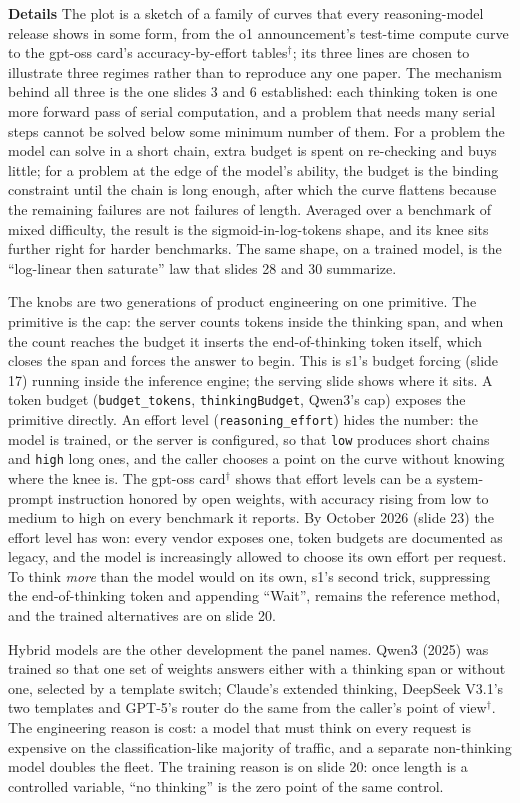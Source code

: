 \documentclass[11pt,letterpaper]{article}
\newcommand{\para}[1]{\medskip\noindent\textbf{#1}\quad}
\begin{document}
\para{Details} The plot is a sketch of a family of curves that every reasoning-model release shows in some form, from the o1 announcement's test-time compute curve to the gpt-oss card's accuracy-by-effort tables$^\dagger$; its three lines are chosen to illustrate three regimes rather than to reproduce any one paper. The mechanism behind all three is the one slides 3 and 6 established: each thinking token is one more forward pass of serial computation, and a problem that needs many serial steps cannot be solved below some minimum number of them. For a problem the model can solve in a short chain, extra budget is spent on re-checking and buys little; for a problem at the edge of the model's ability, the budget is the binding constraint until the chain is long enough, after which the curve flattens because the remaining failures are not failures of length. Averaged over a benchmark of mixed difficulty, the result is the sigmoid-in-log-tokens shape, and its knee sits further right for harder benchmarks. The same shape, on a trained model, is the ``log-linear then saturate'' law that slides 28 and 30 summarize.

The knobs are two generations of product engineering on one primitive. The primitive is the cap: the server counts tokens inside the thinking span, and when the count reaches the budget it inserts the end-of-thinking token itself, which closes the span and forces the answer to begin. This is s1's budget forcing (slide 17) running inside the inference engine; the serving slide shows where it sits. A token budget (\texttt{budget\_tokens}, \texttt{thinkingBudget}, Qwen3's cap) exposes the primitive directly. An effort level (\texttt{reasoning\_effort}) hides the number: the model is trained, or the server is configured, so that \texttt{low} produces short chains and \texttt{high} long ones, and the caller chooses a point on the curve without knowing where the knee is. The gpt-oss card$^\dagger$ shows that effort levels can be a system-prompt instruction honored by open weights, with accuracy rising from low to medium to high on every benchmark it reports. By October 2026 (slide 23) the effort level has won: every vendor exposes one, token budgets are documented as legacy, and the model is increasingly allowed to choose its own effort per request. To think \emph{more} than the model would on its own, s1's second trick, suppressing the end-of-thinking token and appending ``Wait'', remains the reference method, and the trained alternatives are on slide 20.

Hybrid models are the other development the panel names. Qwen3 (2025) was trained so that one set of weights answers either with a thinking span or without one, selected by a template switch; Claude's extended thinking, DeepSeek V3.1's two templates and GPT-5's router do the same from the caller's point of view$^\dagger$. The engineering reason is cost: a model that must think on every request is expensive on the classification-like majority of traffic, and a separate non-thinking model doubles the fleet. The training reason is on slide 20: once length is a controlled variable, ``no thinking'' is the zero point of the same control.
\end{document}
